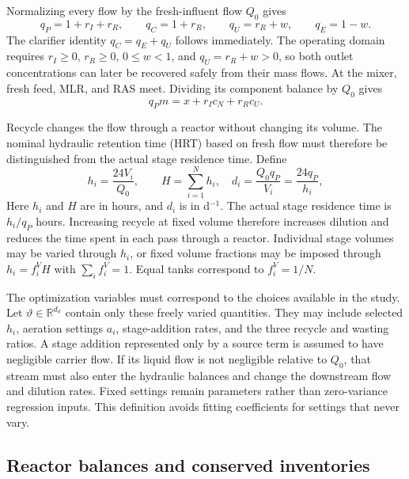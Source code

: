 \documentclass[a4paper,fleqn]{cas-sc}
\newcommand{\R}{\mathbb{R}}
\begin{document}
Normalizing every flow by the fresh-influent flow $Q_0$ gives
\begin{equation}
q_P=1+r_I+r_R,\qquad q_C=1+r_R,\qquad
q_U=r_R+w,\qquad q_E=1-w.
\label{eq:flows}
\end{equation}
The clarifier identity $q_C=q_E+q_U$ follows immediately. The operating domain requires $r_I\ge0$, $r_R\ge0$, $0\le w<1$, and $q_U=r_R+w>0$, so both outlet concentrations can later be recovered safely from their mass flows. At the mixer, fresh feed, MLR, and RAS meet. Dividing its component balance by $Q_0$ gives
\begin{equation}
q_Pm=x+r_Ic_N+r_Rc_U.
\label{eq:mixer}
\end{equation}

Recycle changes the flow through a reactor without changing its volume. The nominal hydraulic retention time (HRT) based on fresh flow must therefore be distinguished from the actual stage residence time. Define
\begin{equation}
h_i=\frac{24V_i}{Q_0},\qquad H=\sum_{i=1}^{N}h_i,\quad
d_i=\frac{Q_0q_P}{V_i}=\frac{24q_P}{h_i},
\label{eq:stagehydraulics}
\end{equation}
Here $h_i$ and $H$ are in hours, and $d_i$ is in d$^{-1}$. The actual stage residence time is $h_i/q_P$ hours. Increasing recycle at fixed volume therefore increases dilution and reduces the time spent in each pass through a reactor. Individual stage volumes may be varied through $h_i$, or fixed volume fractions may be imposed through $h_i=f_i^V H$ with $\sum_i f_i^V=1$. Equal tanks correspond to $f_i^V=1/N$.

The optimization variables must correspond to the choices available in the study. Let $\vartheta\in\R^{d_\vartheta}$ contain only these freely varied quantities. They may include selected $h_i$, aeration settings $a_i$, stage-addition rates, and the three recycle and wasting ratios. A stage addition represented only by a source term is assumed to have negligible carrier flow. If its liquid flow is not negligible relative to $Q_0$, that stream must also enter the hydraulic balances and change the downstream flow and dilution rates. Fixed settings remain parameters rather than zero-variance regression inputs. This definition avoids fitting coefficients for settings that never vary.

\subsection{Reactor balances and conserved inventories}
\end{document}
